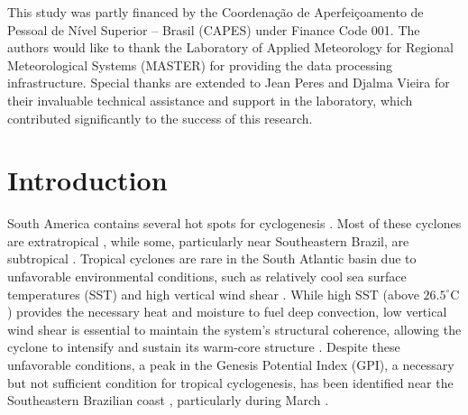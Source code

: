 \documentclass[pdflatex,sn-chicago]{sn-jnl}%
\theoremstyle{plain}
\theoremstyle{definition}
\theoremstyle{remark}
\theoremstyle{definition}
\begin{document}
This study was partly financed by the Coordenação de Aperfeiçoamento de Pessoal de Nível Superior – Brasil (CAPES) under Finance Code 001. The authors would like to thank the Laboratory of Applied Meteorology for Regional Meteorological Systems (MASTER) for providing the data processing infrastructure. Special thanks are extended to Jean Peres and Djalma Vieira for their invaluable technical assistance and support in the laboratory, which contributed significantly to the success of this research.

\section{Introduction}

South America contains several hot spots for cyclogenesis \citep{gan1991surface,reboita2010south,gramcianinov2019properties,couto2024new}. Most of these cyclones are extratropical \citep{marrafon2022classificaccao}, while some, particularly near Southeastern Brazil, are subtropical \citep{gozzo2014subtropical,gozzo2017climatology}. Tropical cyclones are rare in the South Atlantic basin due to unfavorable environmental conditions, such as relatively cool sea surface temperatures (SST) and high vertical wind shear \citep{pezza2005first}. While high SST (above $26.5^{\circ}\text{C}$) provides the necessary heat and moisture to fuel deep convection, low vertical wind shear is essential to maintain the system’s structural coherence, allowing the cyclone to intensify and sustain its warm-core structure \citep{gray1968global,emanuel1986air,davis2003baroclinically,rios2024review}. Despite these unfavorable conditions, a peak in the Genesis Potential Index (GPI), a necessary but not sufficient condition for tropical cyclogenesis, has been identified near the Southeastern Brazilian coast \citep{camargo2007tropical}, particularly during March \citep{andrelina2021climatologia}.
\end{document}
